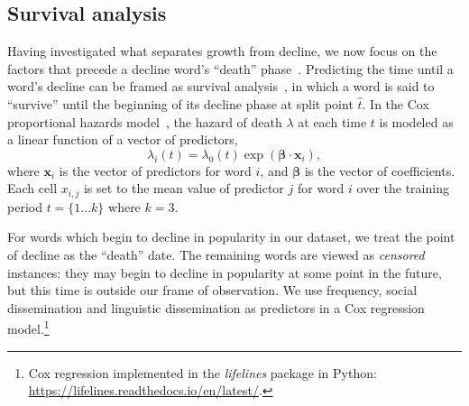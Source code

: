 \subsection{Survival analysis}
\label{sec:results-survival}
Having investigated what separates growth from decline, we now focus on the factors that precede a decline word's ``death'' phase~\cite{drouin2009}.
Predicting the time until a word's decline can be framed as survival analysis~\cite{klein2005}, in which a word is said to ``survive'' until the beginning of its decline phase at split point $\hat{t}$. 
In the Cox proportional hazards model~\cite{david1972}, the hazard of death $\lambda$ at each time $t$ is modeled as a linear function of a vector of predictors,
\begin{equation}
  \lambda_i(t)  = \lambda_0(t) \exp (\mathbf{\beta} \cdot \mathbf{x}_i),
\end{equation}
where $\mathbf{x}_i$ is the vector of predictors for word $i$, and $\mathbf{\beta}$ is the vector of coefficients. Each cell $x_{i,j}$ is set to the mean value of predictor $j$ for word $i$ over the training period $t=\{1 ... k\}$ where $k=3$.

For words which begin to decline in popularity in our dataset, we treat the point of decline as the ``death'' date. The remaining words are viewed as \emph{censored} instances: they may begin to decline in popularity at some point in the future, but this time is outside our frame of observation.
We use frequency, social dissemination and linguistic dissemination as predictors in a Cox regression model.\footnote{Cox regression implemented in the \emph{lifelines} package in Python: \url{https://lifelines.readthedocs.io/en/latest/}.}

